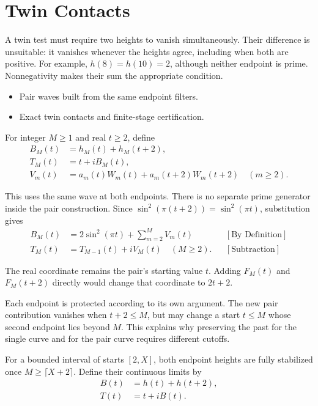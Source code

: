 \section{Twin Contacts}
A twin test must require two heights to vanish simultaneously. Their
difference is unsuitable: it vanishes whenever the heights agree, including
when both are positive. For example, $h(8)=h(10)=2$, although neither
endpoint is prime. Nonnegativity makes their sum the appropriate condition.

\begin{itemize}
\item Pair waves built from the same endpoint filters.
\item Exact twin contacts and finite-stage certification.
\end{itemize}

For integer $M\ge1$ and real $t\ge2$, define
\begin{equation*}
\begin{aligned}
B_M(t)&=h_M(t)+h_M(t+2),\\
T_M(t)&=t+i B_M(t),\\
V_m(t)&=a_m(t)W_m(t)+a_m(t+2)W_m(t+2)\quad(m\ge2).
\end{aligned}
\end{equation*}

This uses the same wave at both endpoints. There is no separate prime
generator inside the pair construction. Since $\sin^2(\pi(t+2))=\sin^2(\pi t)$,
substitution gives
\begin{equation*}
\begin{aligned}
B_M(t)&=2\sin^2(\pi t)+\sum_{m=2}^{M}V_m(t)
&&[\text{By Definition}]\\
T_M(t)&=T_{M-1}(t)+i V_M(t)\quad(M\ge2).
&&[\text{Subtraction}]
\end{aligned}
\end{equation*}

The real coordinate remains the pair's starting value $t$. Adding $F_M(t)$
and $F_M(t+2)$ directly would change that coordinate to $2t+2$.

Each endpoint is protected according to its own argument. The new pair
contribution vanishes when $t+2\le M$, but may change a start $t\le M$
whose second endpoint lies beyond $M$. This explains why preserving the
past for the single curve and for the pair curve requires different cutoffs.

For a bounded interval of starts $[2,X]$, both endpoint heights are fully
stabilized once $M\ge\lceil X+2\rceil$. Define their continuous limits by
\begin{equation*}
\begin{aligned}
B(t)&=h(t)+h(t+2),\\
T(t)&=t+i B(t).
\end{aligned}
\end{equation*}

